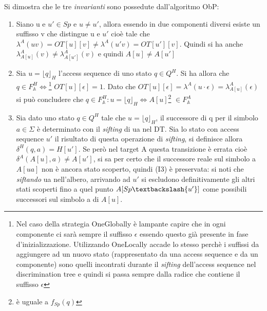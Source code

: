 Si dimostra che le tre \textit{invarianti} sono possedute dall'algoritmo \ac{ObP}:
\begin{enumerate}[label=\textbf{{(I}\arabic*{)}}]
\item Siano u e $u' \in Sp \text{ e } u \neq u' $,  allora essendo in due componenti diversi esiste un suffisso v che distingue u e $u'$ cioè tale che $\lambda^{A}(uv)=OT[u][v] \neq \lambda^{A}(u'v)=OT[u'][v]$. Quindi si ha anche $\lambda_{A[u]}^{A}(v) \neq \lambda_{A[u']}^{A}(v)$ e quindi $A[u] \neq A[u']$
\item  Sia $u=\lfloor q \rfloor_{H} $ l'access sequence di uno stato $q \in Q^H$.  Si ha allora che $q \in F_{\mathbb{A}}^{H} \iff$\!\!\footnote{Nel caso della strategia OneGlobally è lampante capire che in ogni componente ci sarà sempre il suffisso $\epsilon$ essendo questo già presente in fase d'inizializzazione. Utilizzando OneLocally accade lo stesso perchè i suffissi da aggiungere ad un nuovo stato (rappresentato da una access sequence e da un componente) sono quelli incontrati durante il \textit{sifting} dell'access sequence nel discrimination tree e quindi si passa sempre dalla radice che contiene il suffisso $\epsilon$} $OT[u][\epsilon]=1$.  Dato che $OT[u][\epsilon]=\lambda^{A}(u\cdot\epsilon)=\lambda_{A[u]}^{A}(\epsilon)$ si può concludere che $q \in  F_{\mathbb{A}}^{H} : u=\lfloor q \rfloor_{H} \Leftrightarrow A[u]$\footnote{è uguale a $f_{Sp}(q)$} $\in F_{\mathbb{A}}^{A}$
\item Sia dato uno stato $q \in Q^{H} $ tale che $u = \lfloor q \rfloor_{H}$, il successore di q per il simbolo $a \in\Sigma$ è determinato con il \textit{sifting} di ua nel \ac{DT}. Sia lo stato con access sequence $u'$ il risultato di questa operazione di \textit{sifting}, si definisce allora $\delta^{H}(q,a) = H[u']$. Se però nel target A questa transizione è errata cioè $\delta^{A}(A[u],a) \neq A[u']$, si sa per certo che il successore reale sul simbolo a  $A[ua]$ non è ancora stato scoperto, quindi (I3) è preservata: si noti che \textit{siftando} ua nell'albero, arrivando ad $u'$ si escludono definitivamente  gli altri  stati scoperti fino a quel punto $A[Sp\textbackslash \{u'\}]$ come possibili successori sul simbolo a di $A[u]$. 
\end{enumerate}
